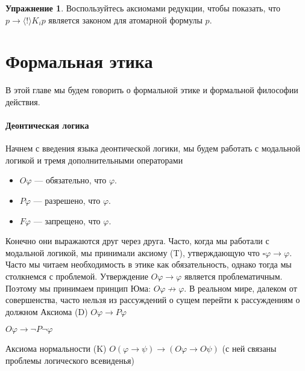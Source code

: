 \documentclass[openany]{book}
\theoremstyle{plain}
\theoremstyle{definition}
\newtheorem{xrc}{Упражнение}[]
\begin{document}
\begin{xrc}
Воспользуйтесь аксиомами редукции, чтобы показать, что \(p \to \langle ! \rangle K_i p\) является законом для атомарной формулы \(p\).
\end{xrc}



\chapter{Формальная этика}

В этой главе мы будем говорить о формальной этике и формальной философии действия.

\subsubsection{Деонтическая логика}

Начнем с введения языка деонтической логики, мы будем работать с модальной логикой и тремя дополнительными операторами 
\begin{itemize}
\item \(O \varphi\) --- обязательно, что \(\varphi\).
\item \(P \varphi\) --- разрешено, что \(\varphi\).
\item \(F \varphi\) --- запрещено, что \(\varphi\).
\end{itemize}

Конечно они выражаются друг через друга.
Часто, когда мы работали с модальной логикой, мы принимали аксиому (T), утверждающую что $\square \varphi \to \varphi$. Часто мы читаем необходимость в этике как обязательность, однако тогда мы столкнемся с проблемой. Утверждение \(O \varphi \to \varphi\) является проблематичным. Поэтому мы принимаем принцип Юма: \(O \varphi \not\to \varphi\). В реальном мире, далеком от совершенства, часто нельзя из рассуждений о сущем перейти к рассуждениям о должном
Аксиома (D) \(O \varphi \to P \varphi\)


\(O \varphi \to \neg P \neg \varphi\)


Аксиома нормальности (K) \(O(\varphi \to \psi) \to (O \varphi \to O \psi) \) (с ней связаны проблемы логического всевиденья)
\end{document}
